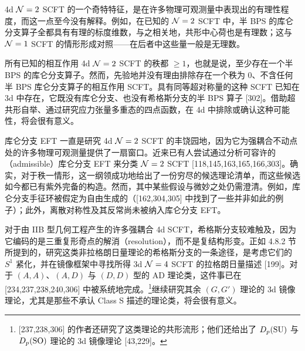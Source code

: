 4d $\mathcal{N}=2$ SCFT 的一个奇特特征，是在许多物理可观测量中表现出的有理性程度，而这一点至今没有解释。例如，在已知的 $\mathcal{N}=2$ SCFT 中，半 BPS 的库仑分支算子全都具有有理的标度维数，与之相关地，共形中心荷也是有理数；这与 $\mathcal{N}=1$ SCFT 的情形形成对照——在后者中这些量一般是无理数。


所有已知的相互作用 4d $\mathcal{N}=2$ SCFT 的秩都 $\ge 1$，也就是说，至少存在一个半 BPS 的库仑分支算子。然而，先验地并没有理由排除存在一个秩为 0、不含任何半 BPS 库仑分支算子的相互作用 SCFT。具有同等超对称量的这种 SCFT 已知在 3d 中存在，它既没有库仑分支、也没有希格斯分支的半 BPS 算子 [302]。借助超共形自举、通过研究应力张量多重态的四点函数，在 4d 中排除或确认这种可能性，将会很有意义。

库仑分支 EFT 一直是研究 4d $\mathcal{N}=2$ SCFT 的丰饶园地，因为它为强耦合不动点处的许多物理可观测量提供了一扇窗口。近来已有人尝试通过分析可容许的（admissible）库仑分支 EFT 来分类 $\mathcal{N}=2$ SCFT [118,145,163,165,166,303]。确实，对于秩一情形，这一纲领成功地给出了一份穷尽的候选理论清单，而这些候选如今都已有紫外完备的构造。然而，其中某些假设与微妙之处仍需澄清。例如，库仑分支手征环被假定为自由生成的（[162,304,305] 中找到了一些并非如此的例子）；此外，离散对称性及其反常尚未被纳入库仑分支 EFT。


对于由 IIB 型几何工程产生的许多强耦合 4d SCFT，希格斯分支较难触及，因为它编码的是三重复形奇点的解消（resolution），而不是复结构形变。正如 4.8.2 节所提到的，研究这类非拉格朗日量理论的希格斯分支的一条途径，是考虑它们的 $S^1$ 紧化，并在镜像框架中寻找所得 3d $\mathcal{N}=4$ SCFT 的拉格朗日量描述 [199]。对于 $(A,A)$、$(A,D)$ 与 $(D,D)$ 型的 AD 理论类，这件事已在 [234,237,238,240,306] 中被系统地完成。\footnote{[237,238,306] 的作者还研究了这类理论的共形流形；他们还给出了 $D_p(\mathrm{SU})$ 与 $D_p(\mathrm{SO})$ 理论的 3d 镜像理论 [43,229]。}继续研究其余 $(G,G')$ 理论的 3d 镜像理论，尤其是那些不承认 Class S 描述的理论类，将会很有意义。

